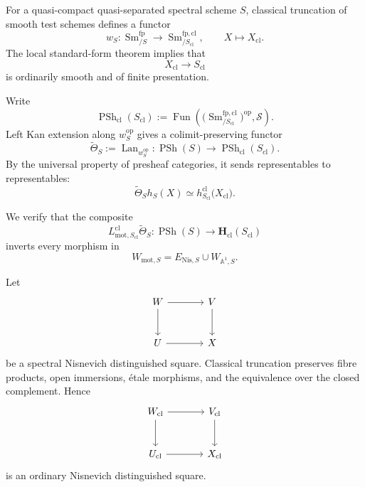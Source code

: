 \begin{construction}
\label{con:classical-motivic-comparison}
For a quasi-compact quasi-separated spectral scheme \(S\), classical
truncation of smooth test schemes defines a functor
\[
    w_S
    \colon
    \operatorname{Sm}^{\mathrm{fp}}_{/S}
    \longrightarrow
    \operatorname{Sm}^{\mathrm{fp},\mathrm{cl}}_{/S_{\mathrm{cl}}},
    \qquad
    X
    \longmapsto
    X_{\mathrm{cl}}.
\]
The local standard-form theorem implies that
\[
    X_{\mathrm{cl}}
    \longrightarrow
    S_{\mathrm{cl}}
\]
is ordinarily smooth and of finite presentation.

Write
\[
    \operatorname{PSh}_{\mathrm{cl}}(S_{\mathrm{cl}})
    :=
    \operatorname{Fun}
    \left(
        \bigl(
            \operatorname{Sm}^{\mathrm{fp},\mathrm{cl}}_{/S_{\mathrm{cl}}}
        \bigr)^{\mathrm{op}},
        \mathcal S
    \right).
\]
Left Kan extension along \(w_S^{\mathrm{op}}\) gives a
colimit-preserving functor
\[
    \widetilde\Theta_S
    :=
    \operatorname{Lan}_{w_S^{\mathrm{op}}}
    \colon
    \operatorname{PSh}(S)
    \longrightarrow
    \operatorname{PSh}_{\mathrm{cl}}(S_{\mathrm{cl}}).
\]
By the universal property of presheaf categories, it sends
representables to representables:
\[
    \widetilde\Theta_Sh_S(X)
    \simeq
    h^{\mathrm{cl}}_{S_{\mathrm{cl}}}
    \bigl(
        X_{\mathrm{cl}}
    \bigr).
\]

We verify that the composite
\[
    L^{\mathrm{cl}}_{\mathrm{mot},S_{\mathrm{cl}}}
    \widetilde\Theta_S
    \colon
    \operatorname{PSh}(S)
    \longrightarrow
    \mathbf H_{\mathrm{cl}}(S_{\mathrm{cl}})
\]
inverts every morphism in
\[
    W_{\mathrm{mot},S}
    =
    E_{\mathrm{Nis},S}
    \cup
    W_{\mathbb A^1,S}.
\]

Let
\[
\begin{tikzcd}[column sep=large, row sep=large]
    W
        \arrow[r]
        \arrow[d]
    &
    V
        \arrow[d]
    \\
    U
        \arrow[r]
    &
    X
\end{tikzcd}
\]
be a spectral Nisnevich distinguished square.  Classical truncation
preserves fibre products, open immersions, étale morphisms, and the
equivalence over the closed complement.  Hence
\[
\begin{tikzcd}[column sep=large, row sep=large]
    W_{\mathrm{cl}}
        \arrow[r]
        \arrow[d]
    &
    V_{\mathrm{cl}}
        \arrow[d]
    \\
    U_{\mathrm{cl}}
        \arrow[r]
    &
    X_{\mathrm{cl}}
\end{tikzcd}
\]
is an ordinary Nisnevich distinguished square.


\end{construction}
